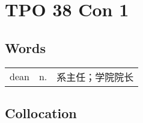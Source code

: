\section{TPO 38 Con 1}

\subsection{Words}

\begin{tabular}{lll}
    dean & n. & 系主任；学院院长 \\
\end{tabular}

\subsection{Collocation}


